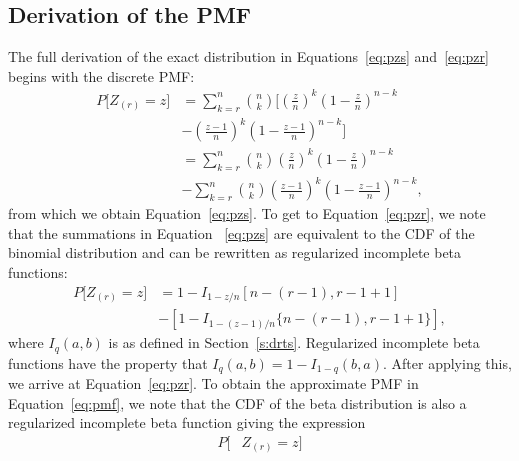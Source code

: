 \documentclass[12pt]{article}
\theoremstyle{plain}
\begin{document}
\begin{appendix}
\section{Derivation of the PMF}\label{appA}

The full derivation of the exact distribution in Equations~\eqref{eq:pzs} and~\eqref{eq:pzr} begins with the discrete PMF:
\begin{align*}
	P\bigg[ Z_{(r)} = z \bigg] &= \sum_{k = r}^n {n \choose k} \bigg[ \left(\frac{z}{n}\right)^k\left(1-\frac{z}{n}\right)^{n-k} \\
	&- \left(\frac{z - 1}{n}\right)^k\left(1-\frac{z - 1}{n}\right)^{n-k} \bigg]\\
	&= \sum_{k = r}^n {n \choose k} \left(\frac{z}{n}\right)^k\left(1-\frac{z}{n}\right)^{n-k} \\
	& -  \sum_{k = r}^n {n \choose k} \left(\frac{z - 1}{n}\right)^k\left(1-\frac{z - 1}{n}\right)^{n-k},
\end{align*}
from which we obtain Equation~\eqref{eq:pzs}. To get to Equation~\eqref{eq:pzr}, we note that the summations in Equation ~\eqref{eq:pzs} are equivalent to the CDF of the binomial distribution and can be rewritten as regularized incomplete beta functions:
\begin{align*}
	P\bigg[ Z_{(r)} = z \bigg] &= 1 - I_{1-z/n}[n - (r-1), r-1+1] \\
	&-  \left[1 - I_{1-(z-1)/n}\{n - (r-1), r-1+1\}\right],
\end{align*}
where $I_q(a,b)$ is as defined in Section~\ref{s:drts}. Regularized incomplete beta functions have the property that $I_q(a,b) = 1 - I_{1-q}(b, a)$. After applying this, we arrive at Equation~\eqref{eq:pzr}. To obtain the approximate PMF in Equation~\eqref{eq:pmf}, we note that the CDF of the beta distribution is also a regularized incomplete beta function giving the expression
\begin{align*}
	P\bigg[ &Z_{(r)} = z \bigg] \\

\end{align*}
\end{appendix}
\end{document}
